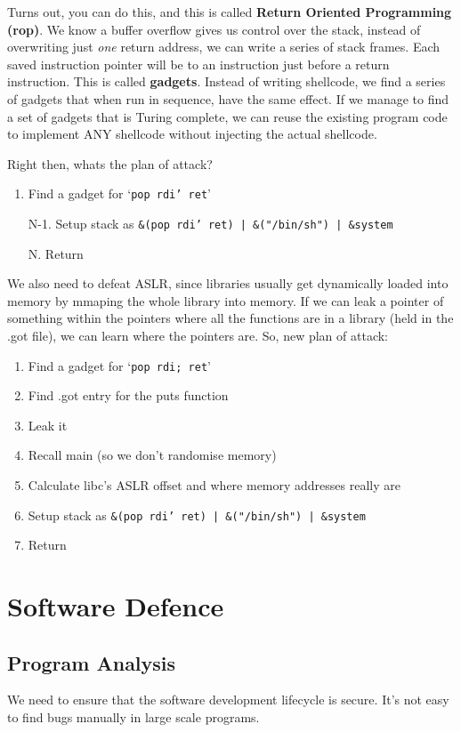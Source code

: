 \documentclass[11pt,a4paper,titlepage,dvipsnames,cmyk]{scrartcl}
\begin{document}
Turns out, you can do this, and this is called \textbf{Return Oriented Programming (rop)}. We know a buffer overflow gives us control over the stack, instead of overwriting just \textit{one} return address, we can write a series of stack frames. Each saved instruction pointer will be to an instruction just before a return instruction. This is called \textbf{gadgets}. Instead of writing shellcode, we find a series of gadgets that when run in sequence, have the same effect. If we manage to find a set of gadgets that is Turing complete, we can reuse the existing program code to implement ANY shellcode without injecting the actual shellcode.

\newpage
Right then, whats the plan of attack?
\begin{enumerate}
\item Find a gadget for `\texttt{pop rdi' ret}'
\item[N-1.] Setup stack as \texttt{\&(pop rdi' ret) | \&("/bin/sh") | \&system}
\item[N.] Return
\end{enumerate}

We also need to defeat ASLR, since libraries usually get dynamically loaded into memory by mmaping the whole library into memory. If we can leak a pointer of something within the pointers where all the functions are in a library (held in the .got file), we can learn where the pointers are. So, new plan of attack:
\begin{enumerate}
\item Find a gadget for `\texttt{pop rdi; ret}'
\item Find .got entry for the puts function
\item Leak it
\item Recall main (so we don't randomise memory)
\item Calculate libc's ASLR offset and where memory addresses really are
\item Setup stack as \texttt{\&(pop rdi' ret) | \&("/bin/sh") | \&system}
\item Return
\end{enumerate}

\section{Software Defence}
\subsection{Program Analysis}
We need to ensure that the software development lifecycle is secure. It's not easy to find bugs manually in large scale programs.
\end{document}
